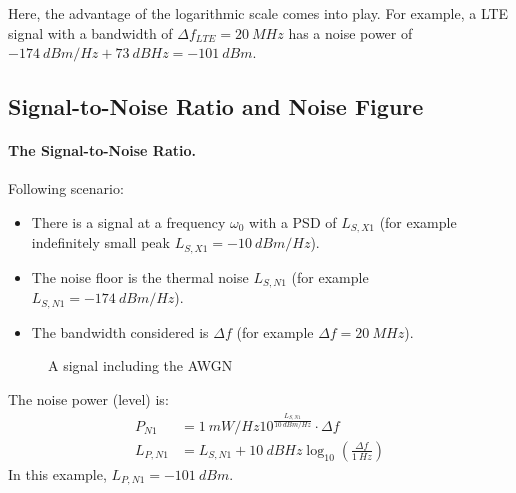 \begin{refsection}
Here, the advantage of the logarithmic scale comes into play. For example, a \ac{LTE} signal with a bandwidth of $\Delta f_{LTE} = \SI{20}{MHz}$ has a noise power of $\SI{-174}{dBm/Hz} + \SI{73}{dBHz} = \SI{-101}{dBm}$.

\subsection{Signal-to-Noise Ratio and Noise Figure}

\paragraph {The Signal-to-Noise Ratio.}

Following scenario:
\begin{itemize}
	\item There is a signal at a frequency $\omega_0$ with a \ac{PSD} of $L_{S,X1}$ (for example indefinitely small peak $L_{S,X1} = \SI{-10}{dBm/Hz}$).
	\item The noise floor is the thermal noise $L_{S,N1}$ (for example $L_{S,N1} = \SI{-174}{dBm/Hz}$).
	\item The bandwidth considered is $\Delta f$ (for example $\Delta f = \SI{20}{MHz}$).
\end{itemize}

\begin{figure}[H]
	\centering
	\caption[A signal including the AWGN]{A signal including the \ac{AWGN}}
\end{figure}

The noise power (level) is:
\begin{equation}
	\begin{split}
		P_{N1} &= \SI{1}{mW/Hz} 10^{\frac{L_{S,N1}}{\SI{10}{dBm/Hz}}} \cdot \Delta f \\
		L_{P,N1} &= L_{S,N1} + \SI{10}{dBHz} \log_{10} \left(\frac{\Delta f}{\SI{1}{Hz}}\right)
	\end{split}
\end{equation}
In this example, $L_{P,N1} = \SI{-101}{dBm}$.


\end{refsection}
